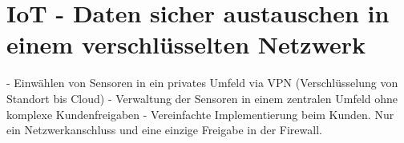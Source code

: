 \section{IoT - Daten sicher austauschen in einem verschlüsselten Netzwerk}

- Einwählen von Sensoren in ein privates Umfeld via VPN (Verschlüsselung von Standort bis Cloud)
- Verwaltung der Sensoren in einem zentralen Umfeld ohne komplexe Kundenfreigaben
- Vereinfachte Implementierung beim Kunden. Nur ein Netzwerkanschluss und eine einzige Freigabe in der Firewall.